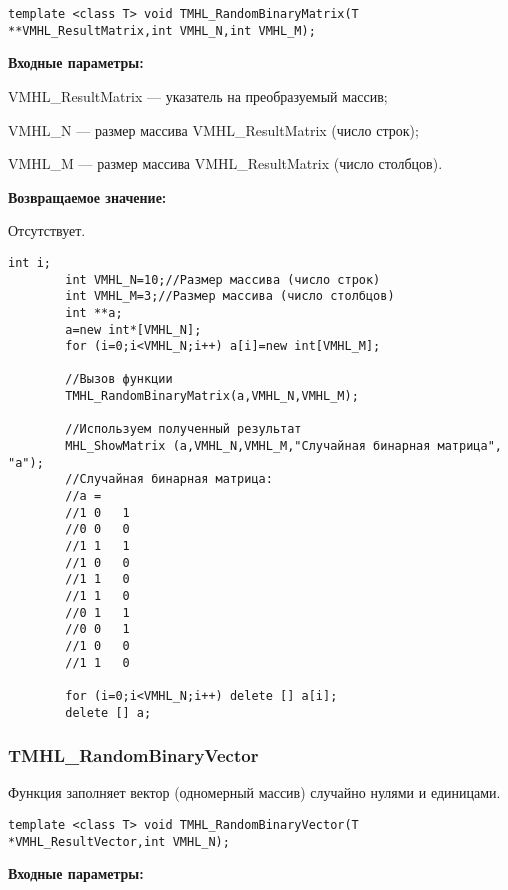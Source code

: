 \documentclass[a4paper,12pt]{article}
\begin{document}
\begin{lstlisting}[label=code_syntax_TMHL_RandomBinaryMatrix,caption=Синтаксис]
template <class T> void TMHL_RandomBinaryMatrix(T **VMHL_ResultMatrix,int VMHL_N,int VMHL_M);
\end{lstlisting}

\textbf{Входные параметры:}
 
VMHL\_ResultMatrix --- указатель на преобразуемый массив;
 
VMHL\_N --- размер массива VMHL\_ResultMatrix (число строк);
 
VMHL\_M --- размер массива VMHL\_ResultMatrix (число столбцов). 

\textbf{Возвращаемое значение:}

Отсутствует.


\begin{lstlisting}[label=code_use_TMHL_RandomBinaryMatrix,caption=Пример использования]
        int i;
        int VMHL_N=10;//Размер массива (число строк)
        int VMHL_M=3;//Размер массива (число столбцов)
        int **a;
        a=new int*[VMHL_N];
        for (i=0;i<VMHL_N;i++) a[i]=new int[VMHL_M];

        //Вызов функции
        TMHL_RandomBinaryMatrix(a,VMHL_N,VMHL_M);

        //Используем полученный результат
        MHL_ShowMatrix (a,VMHL_N,VMHL_M,"Случайная бинарная матрица", "a");
        //Случайная бинарная матрица:
        //a =
        //1	0	1
        //0	0	0
        //1	1	1
        //1	0	0
        //1	1	0
        //1	1	0
        //0	1	1
        //0	0	1
        //1	0	0
        //1	1	0

        for (i=0;i<VMHL_N;i++) delete [] a[i];
        delete [] a;
\end{lstlisting}

\subsubsection{TMHL\_RandomBinaryVector}\label{TMHL_RandomBinaryVector}

Функция заполняет вектор (одномерный массив) случайно нулями и единицами.


\begin{lstlisting}[label=code_syntax_TMHL_RandomBinaryVector,caption=Синтаксис]
template <class T> void TMHL_RandomBinaryVector(T *VMHL_ResultVector,int VMHL_N);
\end{lstlisting}

\textbf{Входные параметры:}
 
\end{document}
